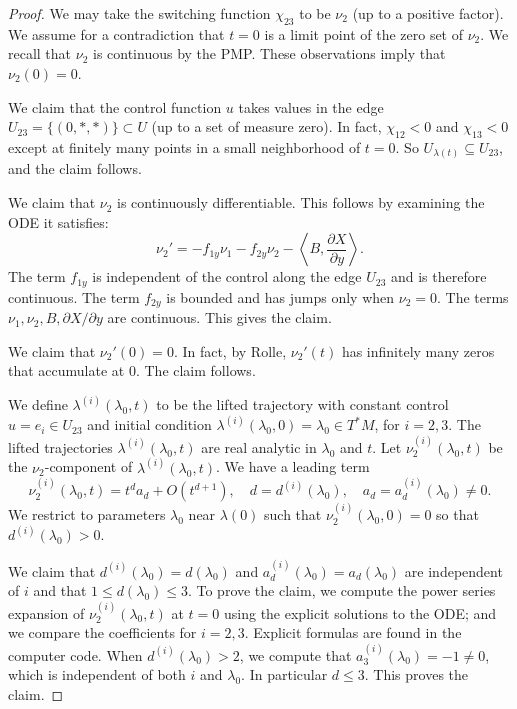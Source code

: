 \documentclass{article}
\theoremstyle{remark}
\newcommand{\ang}[1]{\left\langle{#1}\right\rangle}
\newcommand{\partials}[2]{\frac{\partial #1}{\partial #2}}
\begin{document}
\begin{proof} 
%
  We may take the switching function $\chi_{23}$ to be $\nu_2$ (up to
  a positive factor).  We assume for a contradiction that
  $t=0$ is a limit point of the zero
  set of $\nu_2$.  We recall that $\nu_2$ is continuous by the
  PMP.  These observations imply that $\nu_2(0)=0$.

We claim that the control function $u$ takes values in the edge
$U_{23}=\{(0,*,*)\}\subset U$ (up to a set of measure zero).  In fact,
$\chi_{12}<0$ and $\chi_{13}<0$ except at finitely many points in a
small neighborhood of $t=0$.  So $U_{\lambda(t)}\subseteq U_{23}$,
and the claim follows.

We claim that $\nu_2$ is continuously differentiable.  This follows by
examining the ODE it satisfies:
\[
\nu_2' = -f_{1y}\nu_1 - f_{2y} \nu_2 - \ang{B,\partials{X}{y}}.
\]
The term $f_{1y}$ is independent of the control along the edge
$U_{23}$ and is therefore continuous.  The term $f_{2y}$ is bounded
and has jumps only when $\nu_2=0$.  The terms $\nu_1,\nu_2,B,\partial
X/\partial y$ are continuous.  This gives the claim.

We claim that $\nu_2'(0)=0$.  In fact, by Rolle, $\nu_2'(t)$ has
infinitely many zeros that accumulate at $0$.  The claim follows.

We define $\lambda^{(i)}(\lambda_0,t)$ to be the lifted trajectory
with constant control $u=e_i\in U_{23}$ and initial condition
$\lambda^{(i)}(\lambda_0,0)=\lambda_0\in T^*M$, for $i=2,3$.  The
lifted trajectories $\lambda^{(i)}(\lambda_0,t)$ are real analytic in
$\lambda_0$ and $t$.  Let $\nu^{(i)}_2(\lambda_0,t)$ be the
$\nu_2$-component of $\lambda^{(i)}(\lambda_0,t)$.  We have a leading
term
\[
\nu^{(i)}_2(\lambda_0,t) = t^d a_d + O(t^{d+1}),\quad
d = d^{(i)}(\lambda_0),\quad a_d = a_d^{(i)}(\lambda_0)\ne0.
\]
We restrict to parameters $\lambda_0$ near $\lambda(0)$ such that
$\nu_2^{(i)}(\lambda_0,0)=0$ so that $d^{(i)}(\lambda_0)>0$.

We claim that $d^{(i)}(\lambda_0) = d(\lambda_0)$ and
$a_d^{(i)}(\lambda_0)=a_d(\lambda_0)$ are independent of $i$ and that
$1 \le d(\lambda_0) \le 3$.  To prove the claim, we compute the power
series expansion of $\nu_2^{(i)}(\lambda_0,t)$ at $t=0$ using the
explicit solutions to the ODE; and we compare the coefficients for
$i=2,3$.  Explicit formulas are found in the computer code.  When
$d^{(i)}(\lambda_0)> 2$, we compute that
$a_3^{(i)}(\lambda_0)=-1\ne0$, which is independent of both $i$ and
$\lambda_0$.  In particular $d\le 3$.  This proves the claim.


\end{proof}
\end{document}
